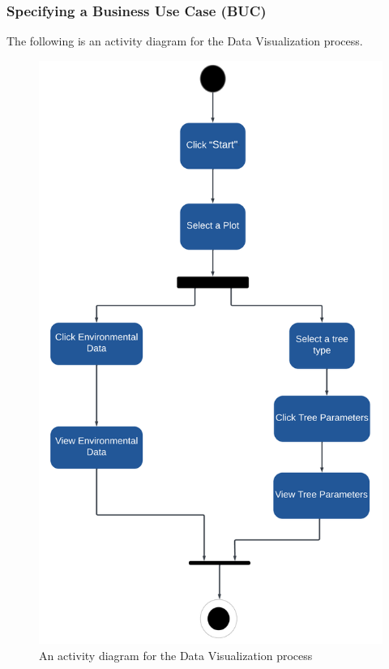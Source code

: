 \documentclass{article}
\begin{document}
\subsubsection{Specifying a Business Use Case (BUC)}
The following is an activity diagram for the Data Visualization process.
\begin{figure}[H]
    \centering
    \includegraphics[scale=0.35]{SRS_Pictures/Activity_Diagram.png}
    \caption{An activity diagram for the Data Visualization process}
\end{figure}
\end{document}
